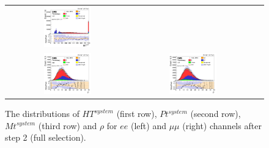 \begin{figure}[ht]
\begin{center}
\begin{tabular}{ccc}
      \includegraphics[width=0.4\textwidth]{figures/tW/fig/Step2/mumu/H_MT_sys.png}  \\
      \includegraphics[width=0.4\textwidth]{figures/tW/fig/Step2/ee/H_rho.png}&
      \includegraphics[width=0.4\textwidth]{figures/tW/fig/Step2/mumu/H_rho.png}\\
    \end{tabular}
    \caption{The distributions of $HT^{system}$ (first row), $Pt^{system}$ (second row), $Mt^{system}$ (third row)  and $\rho$ for $ee$ (left) and $\mu\mu$ (right) channels after step 2 (full selection).
    \label{fig:step2_HT_Pt_Mt_rho}}
  \end{center}
\end{figure}



